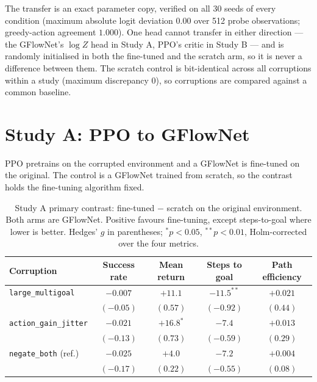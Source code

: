 The transfer is an exact parameter copy, verified on all 30 seeds of every
condition (maximum absolute logit deviation $0.00$ over 512 probe observations;
greedy-action agreement $1.000$). One head cannot transfer in either direction
--- the GFlowNet's $\log Z$ head in Study A, PPO's critic in Study B --- and is
randomly initialised in both the fine-tuned and the scratch arm, so it is never
a difference between them. The scratch control is bit-identical across all
corruptions within a study (maximum discrepancy $0$), so corruptions are
compared against a common baseline.

\clearpage
\section{Study A: PPO to GFlowNet}

PPO pretrains on the corrupted environment and a GFlowNet is fine-tuned on the
original. The control is a GFlowNet trained from scratch, so the contrast holds
the fine-tuning algorithm fixed.

\begin{table}[htbp]
\centering
\setlength{\tabcolsep}{4pt}
\caption{Study A primary contrast: fine-tuned $-$ scratch on the original
environment. Both arms are GFlowNet. Positive favours fine-tuning, except
steps-to-goal where lower is better. Hedges' $g$ in parentheses;
${}^{*}p<0.05$, ${}^{**}p<0.01$, Holm-corrected over the four metrics.}
\small
\begin{tabular}{lcccc}
\toprule
Corruption & Success rate & Mean return & Steps to goal & Path efficiency \\
\midrule
\texttt{large\_multigoal} & $-0.007$ & $+11.1$ & $-11.5^{**}$ & $+0.021$ \\
 & \footnotesize$(-0.05)$ & \footnotesize$(0.57)$ & \footnotesize$(-0.92)$ & \footnotesize$(0.44)$ \\[3pt]
\texttt{action\_gain\_jitter} & $-0.021$ & $+16.8^{*}$ & $-7.4$ & $+0.013$ \\
 & \footnotesize$(-0.13)$ & \footnotesize$(0.73)$ & \footnotesize$(-0.59)$ & \footnotesize$(0.29)$ \\[3pt]
\texttt{negate\_both} (ref.) & $-0.025$ & $+4.0$ & $-7.2$ & $+0.004$ \\
 & \footnotesize$(-0.17)$ & \footnotesize$(0.22)$ & \footnotesize$(-0.55)$ & \footnotesize$(0.08)$ \\
\bottomrule
\end{tabular}
\end{table}

